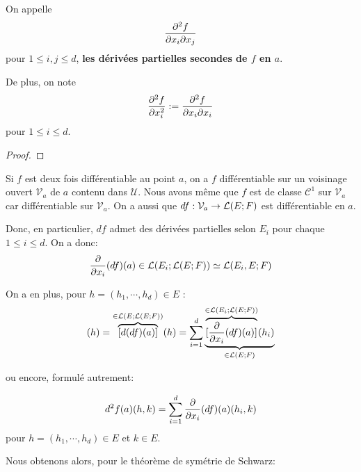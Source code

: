 On appelle 
\begin{equation*}
	\pdv{f}{x_{i}}{x_{j}} (a)
\end{equation*}
pour $1 \leq i, j \leq d$, \textbf{les dérivées partielles secondes de $f$ en $a$}.

De plus, on note
\begin{equation*}
	\pdv[2]{f}{x_{i}} (a) := \pdv{f}{x_{i}}{x_{i}} (a)
\end{equation*}
pour $1 \leq i \leq d$.

\ifdefined\outputproof
\begin{proof}



\end{proof}
\fi

\begin{remarque}
	Si $f$ est deux fois différentiable au point $a$, on a $f$ différentiable
	sur un voisinage ouvert $\mathcal{V}_{a}$ de $a$ contenu dans $\mathcal{U}$.
	Nous avons même que $f$ est de classe $\mathcal{C}^{1}$ sur
	$\mathcal{V}_{a}$ car différentiable sur $\mathcal{V}_{a}$.
	On a aussi que $df : \mathcal{V}_{a} \rightarrow \mathcal{L}(E; F)$ est
	différentiable en $a$.

	Donc, en particulier, $df$ admet des dérivées partielles selon $E_{i}$ pour
	chaque $1 \leq i \leq d$.
	On a donc:
	\begin{equation*}
		\pdv{x_{i}} (df)(a) \in \mathcal{L}(E_{i}; \mathcal{L}(E; F))
		\simeq \mathcal{L}(E_{i}, E; F)
	\end{equation*}

	On a en plus, pour $h = (h_{1}, \cdots, h_{d}) \in E$ :
	\begin{equation*}
		[d^{2}f(a)](h) = \overbrace{[d(df)(a)]}^{\in \GScontinueHomo{E}{\GScontinueHomo{E}{F}}} (h) = \displaystyle \sum_{i = 1}^{d} \underbrace{\overbrace{[\pdv{x_{i}}
		(df)(a)]}^{\in \GScontinueHomo{E_{i}}{\GScontinueHomo{E}{F}}}
		(h_{i})}_{\in \GScontinueHomo{E}{F}}
	\end{equation*}

	ou encore, formulé autrement:

	\begin{equation*}
		d^{2}f(a)(h, k) = \displaystyle \sum_{i = 1}^{d} \pdv{x_{i}}
		(df)(a)(h_{i}, k)
	\end{equation*}
	pour $h = (h_{1}, \cdots, h_{d}) \in E$ et $k \in E$.

\end{remarque}
Nous obtenons alors, pour le théorème de symétrie de Schwarz:

